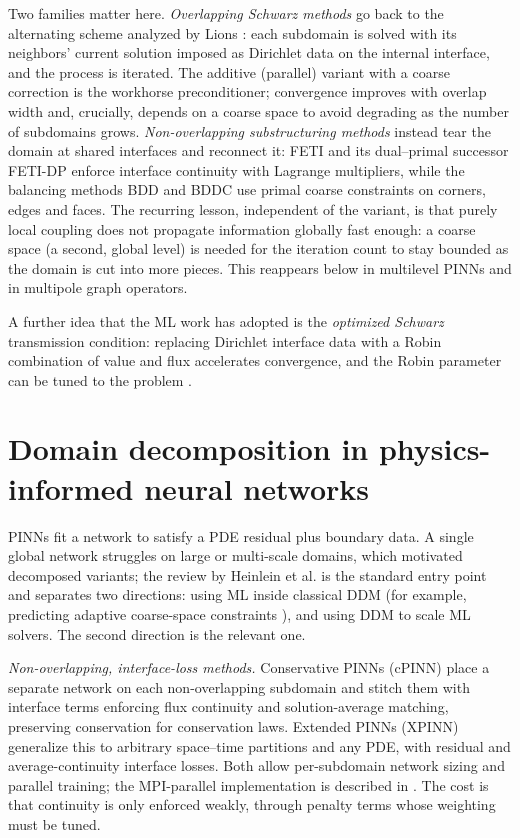 \documentclass[11pt]{article}
\begin{document}
Two families matter here. \emph{Overlapping Schwarz methods} go back to the
alternating scheme analyzed by Lions \cite{lions1988schwarz}: each subdomain is
solved with its neighbors' current solution imposed as Dirichlet data on the
internal interface, and the process is iterated. The additive (parallel) variant
with a coarse correction \cite{dryja1994smalloverlap} is the workhorse
preconditioner; convergence improves with overlap width and, crucially, depends
on a coarse space to avoid degrading as the number of subdomains grows.
\emph{Non-overlapping substructuring methods} instead tear the domain at shared
interfaces and reconnect it: FETI \cite{farhat1991feti} and its dual--primal
successor FETI-DP \cite{farhat2001fetidp} enforce interface continuity with
Lagrange multipliers, while the balancing methods BDD \cite{mandel1993bdd} and
BDDC \cite{dohrmann2003bddc} use primal coarse constraints on corners, edges and
faces. The recurring lesson, independent of the variant, is that purely local
coupling does not propagate information globally fast enough: a coarse space (a
second, global level) is needed for the iteration count to stay bounded as the
domain is cut into more pieces. This reappears below in multilevel PINNs and in
multipole graph operators.

A further idea that the ML work has adopted is the \emph{optimized Schwarz}
transmission condition: replacing Dirichlet interface data with a Robin
combination of value and flux accelerates convergence, and the Robin parameter
can be tuned to the problem \cite{dolean2015ddm}.

\section{Domain decomposition in physics-informed neural networks}

PINNs \cite{raissi2019pinn} fit a network to satisfy a PDE residual plus
boundary data. A single global network struggles on large or multi-scale
domains, which motivated decomposed variants; the review by Heinlein et al.
\cite{heinlein2021review} is the standard entry point and separates two
directions: using ML inside classical DDM (for example, predicting adaptive
coarse-space constraints \cite{heinlein2019adaptive}), and using DDM to scale ML
solvers. The second direction is the relevant one.

\emph{Non-overlapping, interface-loss methods.} Conservative PINNs (cPINN)
\cite{jagtap2020cpinn} place a separate network on each non-overlapping
subdomain and stitch them with interface terms enforcing flux continuity and
solution-average matching, preserving conservation for conservation laws.
Extended PINNs (XPINN) \cite{jagtap2020xpinn} generalize this to arbitrary
space--time partitions and any PDE, with residual and average-continuity
interface losses. Both allow per-subdomain network sizing and parallel training;
the MPI-parallel implementation is described in
\cite{shukla2021parallelpinn}. The cost is that continuity is only enforced
weakly, through penalty terms whose weighting must be tuned.
\end{document}
